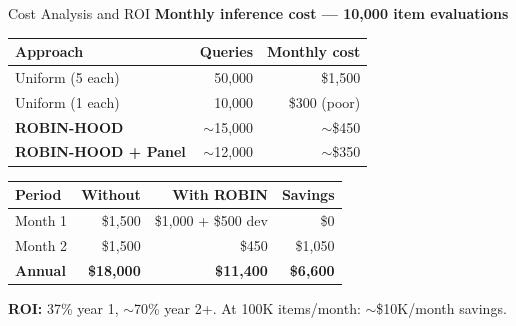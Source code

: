 \documentclass[11pt, aspectratio=169]{beamer}
\begin{document}
\begin{frame}{Cost Analysis and ROI}
  \centering
  \textbf{Monthly inference cost --- 10,000 item evaluations}

  \vspace{0.15cm}
  {\footnotesize
  \begin{tabularx}{0.7\textwidth}{l r r}
    \toprule
    \textbf{Approach} & \textbf{Queries} & \textbf{Monthly cost} \\
    \midrule
    Uniform (5 each)      & 50,000 & \$1,500 \\
    Uniform (1 each)      & 10,000 & \$300 (poor) \\
    \textbf{ROBIN-HOOD}   & $\sim$15,000 & $\sim$\$450 \\
    \textbf{ROBIN-HOOD + Panel} & $\sim$12,000 & $\sim$\$350 \\
    \bottomrule
  \end{tabularx}
  }

  \vspace{0.15cm}
  {\footnotesize
  \begin{tabularx}{0.9\textwidth}{l r r r}
    \toprule
    \textbf{Period} & \textbf{Without} & \textbf{With ROBIN} & \textbf{Savings} \\
    \midrule
    Month 1 & \$1,500 & \$1,000 + \$500 dev & \$0 \\
    Month 2 & \$1,500 & \$450 & \alert{\$1,050} \\
    \textbf{Annual} & \textbf{\$18,000} & \textbf{\$11,400} & \textbf{\$6,600} \\
    \bottomrule
  \end{tabularx}
  }

  \vspace{0.1cm}
  {\small\textbf{ROI:} 37\% year 1, $\sim$70\% year 2+.
   At 100K items/month: $\sim$\$10K/month savings.}
\end{frame}
\end{document}
